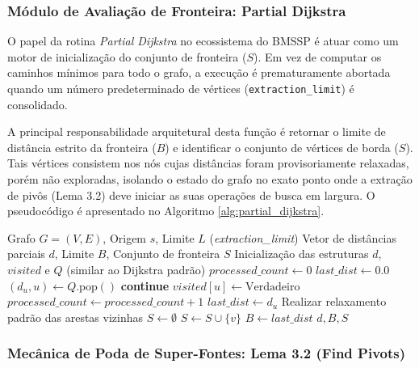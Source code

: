 \documentclass[10pt,a4paper]{article}
\begin{document}
\subsubsection{Módulo de Avaliação de Fronteira: Partial Dijkstra}

O papel da rotina \textit{Partial Dijkstra} no ecossistema do BMSSP é atuar como um motor de inicialização do conjunto de fronteira ($S$). Em vez de computar os caminhos mínimos para todo o grafo, a execução é prematuramente abortada quando um número predeterminado de vértices (\texttt{extraction\_limit}) é consolidado.

A principal responsabilidade arquitetural desta função é retornar o limite de distância estrito da fronteira ($B$) e identificar o conjunto de vértices de borda ($S$). Tais vértices consistem nos nós cujas distâncias foram provisoriamente relaxadas, porém não exploradas, isolando o estado do grafo no exato ponto onde a extração de pivôs (Lema 3.2) deve iniciar as suas operações de busca em largura. O pseudocódigo é apresentado no Algoritmo \ref{alg:partial_dijkstra}.

\begin{algorithm}[H]
\caption{Dijkstra Parcial (Inicialização de Fronteira)}\label{alg:partial_dijkstra}
\begin{algorithmic}[1]
\Require Grafo $G = (V, E)$, Origem $s$, Limite $L$ (\textit{extraction\_limit})
\Ensure Vetor de distâncias parciais $d$, Limite $B$, Conjunto de fronteira $S$
\State Inicialização das estruturas $d$, $visited$ e $Q$ (similar ao Dijkstra padrão)
\State $processed\_count \gets 0$
\State $last\_dist \gets 0.0$
    \State $(d_u, u) \gets Q.\text{pop}()$
        \State \textbf{continue}
    \EndIf
    \State $visited[u] \gets \text{Verdadeiro}$
    \State $processed\_count \gets processed\_count + 1$
    \State $last\_dist \gets d_u$
    \State Realizar relaxamento padrão das arestas vizinhas
\EndWhile
\State $S \gets \emptyset$
        \State $S \gets S \cup \{v\}$
    \EndIf
\EndFor
\State $B \gets last\_dist$
\State \Return $d, B, S$
\end{algorithmic}
\end{algorithm}


\subsubsection{Mecânica de Poda de Super-Fontes: Lema 3.2 (Find Pivots)}
\end{document}
